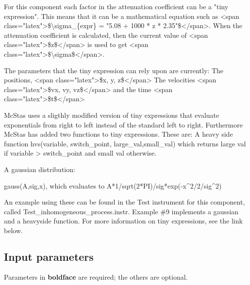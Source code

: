 For this component each factor in the attenuation coefficient can be a "tiny expression". This means that it can be a mathematical equation such as \textless{}span class="latex"\textgreater{}\$\textbackslash{}sigma\_\{expr\} = "5.08 + 1000 * z * 2.35"\$\textless{}/span\textgreater{}. When the attenuation coefficient is calculated, then the current value of \textless{}span class="latex"\textgreater{}\$z\$\textless{}/span\textgreater{} is used to get \textless{}span class="latex"\textgreater{}\$\textbackslash{}sigma\$\textless{}/span\textgreater{}.

The parameters that the tiny expression can rely upon are currently: The positions, \textless{}span class="latex"\textgreater{}\$x, y, z\$\textless{}/span\textgreater{} The velocities \textless{}span class="latex"\textgreater{}\$vx, vy, vz\$\textless{}/span\textgreater{} and the time \textless{}span class="latex"\textgreater{}\$t\$\textless{}/span\textgreater{}

McStas uses a sligthly modified version of tiny expressions that evaluate exponentials from right to left instead of the standard left to right. Furthermore McStas has added two functions to tiny expressions. These are: A heavy side function hvs(variable, switch\_point, large\_val,small\_val) which returns large val if variable \textgreater{} switch\_point and small val otherwise.

A gaussian distribution:

gauss(A,sig,x), which evaluates to A*1/sqrt(2*PI)/sig*exp(-x\textasciicircum{}2/2/sig\textasciicircum{}2)

An example using these can be found in the Test instrument for this component, called Test\_inhomogeneous\_process.instr. Example \#9 implements a gaussian and a heavyside function. For more information on tiny expressions, see the link below.

\subsection*{Input parameters}
Parameters in \textbf{boldface} are required; the others are optional.

